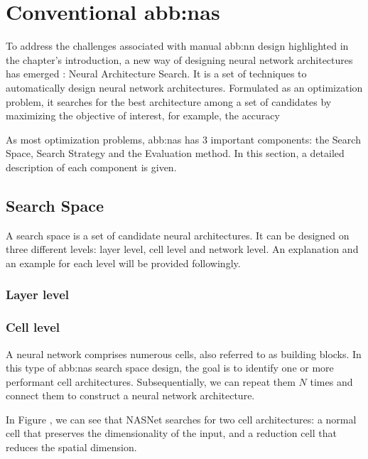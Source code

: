 \section{Conventional \gls{abb:nas}}\label{sec:hw-nas:nas}

    To address the challenges associated with manual \gls{abb:nn} design highlighted in the chapter's introduction, a new way of designing neural network architectures has emerged : Neural Architecture Search. It is a set of techniques to automatically design neural network architectures. Formulated as an optimization problem, it searches for the best architecture among a set of candidates by maximizing the objective of interest, for example, the accuracy~\cite{NAS-survey}
    
    As most optimization problems, \gls{abb:nas} has 3 important components: the Search Space, Search Strategy and the Evaluation method. In this section, a detailed description of each component is given.

    \subsection{Search Space}

        A search space is a set of candidate neural architectures. It can be designed on three different levels: layer level, cell level and network level. An explanation and an example for each level will be provided followingly.

        \subsubsection{Layer level}
        
        \subsubsection{Cell level}

            A neural network comprises numerous cells, also referred to as building blocks. In this type of \gls{abb:nas} search space design, the goal is to identify one or more performant cell architectures. Subsequentially, we can repeat them $N$ times and connect them to construct a neural network architecture.

            In Figure , we can see that NASNet searches for two cell architectures: a normal cell that preserves the dimensionality of the input, and a reduction cell that reduces the spatial dimension.

